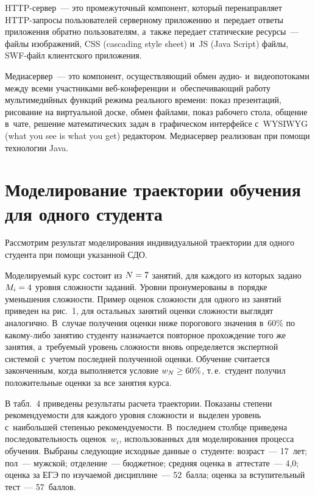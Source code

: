\begin{multicols}{2}
  HTTP-сервер~--- это промежуточный компонент, который перенаправляет 
HTTP-за\-п\-ро\-сы пользователей серверному приложению и~передает ответы 
приложения обратно пользователям, а~также передает статические ресурсы~--- 
файлы изображений, CSS (cascading style sheet) и~JS
(Java Script) фай\-лы, SWF-файл клиентского приложения. 
  
  Медиасервер~--- это компонент, осуществля\-ющий обмен аудио- 
и~видеопотоками между всеми участниками веб-кон\-фе\-рен\-ции 
и~обеспечивающий работу мультимедийных функций режима реального 
времени: показ презентаций, рисование на виртуальной доске, обмен файлами, 
показ рабочего стола, общение в~чате, решение математических задач 
в~графическом интерфейсе с~WYSIWYG (what you see is what you get)
ре\-дак\-то\-ром. Медиасервер 
реализован при помощи технологии Java.
  

\section{Моделирование траектории обучения для одного студента}
  
  Рассмотрим результат моделирования индивидуальной траектории для 
одного студента при помощи указанной СДО. 

Моделируемый курс состоит из 
$N\hm=7$ занятий, для каждого из которых задано $M_i\hm=4$ уровня 
сложности заданий. Уровни пронумерованы в~порядке уменьшения сложности. 
Пример оценок сложности для одного из занятий приведен на рис.~1, для 
остальных занятий оценки сложности выглядят аналогично. В~случае 
получения оценки ниже порогового значения в~60\% по ка\-ко\-му-ли\-бо 
занятию студенту назначается повторное прохождение того же занятия, 
а~требуемый уровень сложности вновь определяется экспертной системой 
с~учетом последней полученной оценки. Обучение считается законченным, 
когда выполняется условие $w_N\hm\geq 60\%$, т.\,е.\ студент получил 
положительные оценки за все занятия курса.
  
  В табл.~4 приведены результаты расчета траек\-тории. Показаны степени 
рекомендуемости для каждо\-го уровня сложности и~выделен уровень 
с~наибольшей степенью рекомендуемости. В~последнем столбце приведена 
последовательность оценок~$w_i$, использованных для моделирования 
процесса обуче\-ния. Выбраны следующие исходные данные о~студенте: 
возраст~--- 17~лет; пол~--- мужской; отделение~--- бюджетное; средняя оценка 
в~аттестате~--- 4,0; оценка за ЕГЭ по изучаемой дис\-цип\-ли\-не~--- 52~балла; 
оценка за вступительный тест~--- 57~баллов.
  

\end{multicols}
